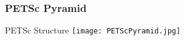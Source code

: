 


\begin{frame}[fragile]
\frametitle{PETSc Pyramid}
 \begin{block}{PETSc Structure} \vspace{0.3cm}
   \texttt{[image: PETScPyramid.jpg]}
 \end{block}

\end{frame}
